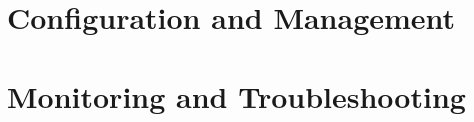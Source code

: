 \documentclass[11pt,twoside,final,openright]{report}
\begin{document}





















\part{Configuration and Management}
























\part{Monitoring and Troubleshooting}
\end{document}
